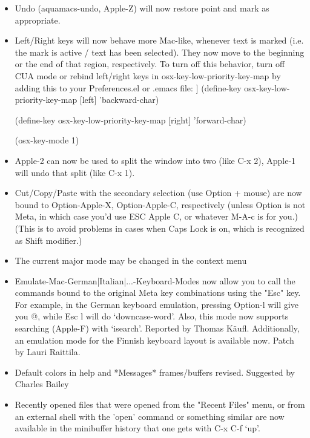 \begin{itemize}
\item Undo (aquamacs-undo, Apple-Z) will now restore point and mark as
        appropriate.

      \item Left/Right keys will now behave more Mac-like, whenever text is         marked (i.e. the mark is active / text has been selected). They now         move to the beginning or the end of that region, respectively. To turn off this behavior, turn off CUA mode or rebind  left/right keys in osx-key-low-priority-key-map by adding this to your Preferences.el or .emacs file:
]
(define-key osx-key-low-priority-key-map [left] 'backward-char)

(define-key osx-key-low-priority-key-map [right] 'forward-char)

(osx-key-mode 1)

\item Apple-2 can now be used to split the window into two (like C-x
        2), Apple-1 will undo that split (like C-x 1).

\item Cut/Copy/Paste with the secondary selection (use Option + mouse)
        are now bound to Option-Apple-X, Option-Apple-C,
        respectively (unless Option is not Meta, in which case you'd use
        ESC Apple C, or whatever M-A-c is for you.)  (This is to avoid
        problems in cases when Caps Lock is on, which is recognized as
        Shift modifier.)

\item The current major mode may be changed in the context menu

\item Emulate-Mac-German|Italian|...-Keyboard-Modes now allow you to
        call the commands bound to the original Meta key combinations
        using the "Esc" key. For example, in the German keyboard
        emulation, pressing Option-l will give you @, while Esc l will do
        `downcase-word'.
        Also, this mode now supports searching (Apple-F) with `isearch'.
        Reported by Thomas Käufl.	Additionally, an emulation mode for the Finnish keyboard layout is available now. Patch by Lauri Raittila.


\item Default colors in help and *Messages* frames/buffers revised.
        Suggested by Charles Bailey

\item Recently opened files that were opened from the "Recent Files"
        menu, or from an external shell with the 'open' command or
        something similar are now available in the minibuffer history that
        one gets with C-x C-f `up'.


\end{itemize}

